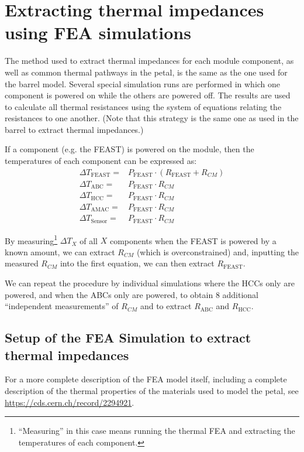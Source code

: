 
\section{ Extracting thermal impedances using FEA simulations}

The method used to extract thermal impedances for each module component, as well as common thermal
pathways in the petal, is the same as the one used for the barrel model. Several special simulation
runs are performed in which one component is powered on while the others are powered off. The results
are used to calculate all thermal resistances using the system of equations relating the resistances
to one another. (Note that this strategy is the same one as used in the barrel to extract thermal
impedances.)

If a component (e.g. the FEAST) is powered on the module, then the temperatures of each component
can be expressed as:
%
\begin{align}
\Delta T_\text{FEAST} =& P_\text{FEAST} \cdot (R_\text{FEAST} + R_{CM}) \label{eq:powered}\\
\Delta T_\text{ABC}   =& P_\text{FEAST} \cdot R_{CM}\\
\Delta T_\text{HCC}   =& P_\text{FEAST} \cdot R_{CM}\\
\Delta T_\text{AMAC}  =& P_\text{FEAST} \cdot R_{CM}\\
\Delta T_\text{Sensor}=& P_\text{FEAST} \cdot R_{CM}
\end{align}

By measuring\footnote{
``Measuring'' in this case means running the thermal FEA and extracting the temperatures of each
component.
} $\Delta T_{X}$ of all $X$ components when the FEAST is powered by a known amount, we can
extract $R_{CM}$ (which is overconstrained) and, inputting the measured $R_{CM}$ into the first
equation, we can then extract $R_\text{FEAST}$.

We can repeat the procedure by individual simulations where the HCCs only are powered, and when the
ABCs only are powered, to obtain 8 additional ``independent measurements'' of $R_{CM}$ and to
extract $R_\text{ABC}$ and $R_\text{HCC}$.

\subsection{Setup of the FEA Simulation to extract thermal impedances}

For a more complete description of the FEA model itself, including a complete description of the
thermal properties of the materials used to model the petal, see
\url{https://cds.cern.ch/record/2294921}.

